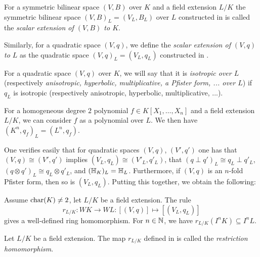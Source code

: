 \documentclass[12pt, leqno, british]{amsart}
\begin{document}
\begin{defi}\label{D:scalar-extension}
For a symmetric bilinear space $(V, B)$ over $K$ and a field extension $L/K$ the symmetric bilinear space $(V, B)_L = (V_L, B_L)$ over $L$ constructed in  is called the \emph{scalar extension of $(V, B)$ to $K$}.

Similarly, for a quadratic space $(V, q)$, we define the \emph{scalar extension of $(V, q)$ to $L$} as the quadratic space $(V, q)_L = (V_L, q_L)$ constructed in .

For a quadratic space $(V, q)$ over $K$, we will say that it is \emph{isotropic over $L$} (respectively \emph{anisotropic, hyperbolic, multiplicative, a Pfister form, ... over $L$}) if $q_L$ is isotropic (respectively anisotropic, hyperbolic, multiplicative, ...).
\end{defi}
\begin{rem}
For a homogeneous degree $2$ polynomial $f \in K[X_1, \ldots, X_n]$ and a field extension $L/K$, we can consider $f$ as a polynomial over $L$.
We then have $(K^n, q_f)_L = (L^n, q_f)$.
\end{rem}
One verifies easily that for quadratic spaces $(V, q)$, $(V', q')$ one has that $(V, q) \cong (V', q')$ implies $(V_L, q_L) \cong (V'_L, q'_L)$, that $(q \perp q')_L \cong q_L \perp q'_L$, $(q \otimes q')_L \cong q_L \otimes q'_L$, and $(\mathbb{H}_K)_L = \mathbb{H}_L$. Furthermore, if $(V, q)$ is an $n$-fold Pfister form, then so is $(V_L, q_L)$.
Putting this together, we obtain the following:
\begin{prop}\label{P:restriction-homomorphism}
Assume $\operatorname{char}(K) \neq 2$, let $L/K$ be a field extension.
The rule
$$ r_{L/K} : WK \to WL : [(V, q)] \mapsto [(V_L, q_L)] $$
gives a well-defined ring homomorphism.
For $n \in \mathbb N$, we have $r_{L/K}(I^n K) \subseteq I^nL$.
\end{prop}
\begin{defi}\label{D:restriction-homomorphism}
Let $L/K$ be a field extension.
The map $r_{L/K}$ defined in  is called the \emph{restriction homomorphism}.
\end{defi}
\end{document}
